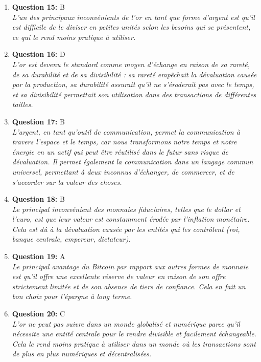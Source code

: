\documentclass[12pt,a4paper]{article}
\begin{document}
\begin{enumerate}
\item \textbf{Question 15:} B
\\ \textit{L'un des principaux inconvénients de l'or en tant que forme d'argent est qu'il est difficile de le diviser en petites unités selon les besoins qui se présentent, ce qui le rend moins pratique à utiliser.}

\item \textbf{Question 16:} D
\\ \textit{L'or est devenu le standard comme moyen d'échange en raison de sa rareté, de sa durabilité et de sa divisibilité : sa rareté empêchait la dévaluation causée par la production, sa durabilité assurait qu'il ne s'éroderait pas avec le temps, et sa divisibilité permettait son utilisation dans des transactions de différentes tailles.}

\item \textbf{Question 17:} B
\\ \textit{L'argent, en tant qu'outil de communication, permet la communication à travers l'espace et le temps, car nous transformons notre temps et notre énergie en un actif qui peut être réutilisé dans le futur sans risque de dévaluation. Il permet également la communication dans un langage commun universel, permettant à deux inconnus d'échanger, de commercer, et de s'accorder sur la valeur des choses.}

\item \textbf{Question 18:} B
\\ \textit{Le principal inconvénient des monnaies fiduciaires, telles que le dollar et l'euro, est que leur valeur est constamment érodée par l'inflation monétaire. Cela est dû à la dévaluation causée par les entités qui les contrôlent (roi, banque centrale, empereur, dictateur).}

\item \textbf{Question 19:} A
\\ \textit{Le principal avantage du Bitcoin par rapport aux autres formes de monnaie est qu'il offre une excellente réserve de valeur en raison de son offre strictement limitée et de son absence de tiers de confiance. Cela en fait un bon choix pour l'épargne à long terme.}

\item \textbf{Question 20:} C
\\ \textit{L'or ne peut pas suivre dans un monde globalisé et numérique parce qu'il nécessite une entité centrale pour le rendre divisible et facilement échangeable. Cela le rend moins pratique à utiliser dans un monde où les transactions sont de plus en plus numériques et décentralisées.}


\end{enumerate}
\end{document}
